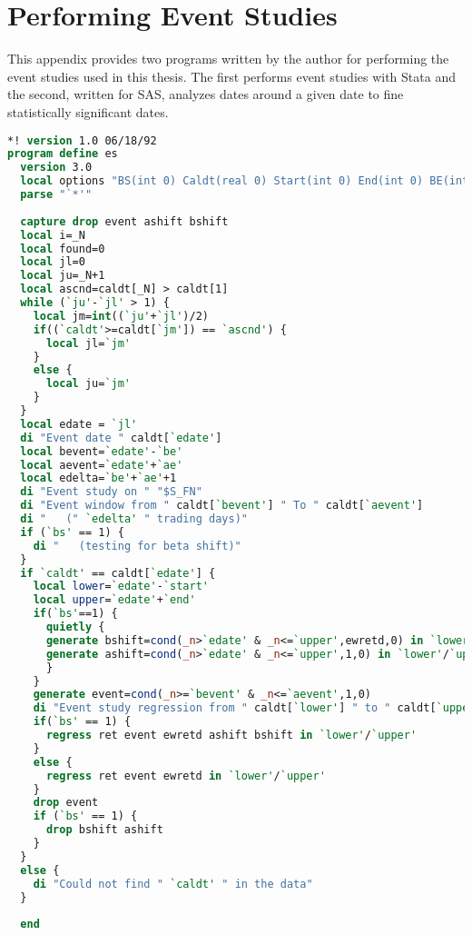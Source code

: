 
\appendix
\chapter{Performing Event Studies}

This appendix provides two programs written by the author for performing the event studies used in this thesis.  The first performs event studies with Stata and the second, written for SAS, analyzes dates around a given date to fine statistically significant dates.

\begin{singlespace}
\begin{lstlisting}[language=stata,caption=Event studies with Stata]
*! version 1.0 06/18/92
program define es
  version 3.0
  local options "BS(int 0) Caldt(real 0) Start(int 0) End(int 0) BE(int 0) AE(int 0)"
  parse "`*'"
  
  capture drop event ashift bshift
  local i=_N
  local found=0
  local jl=0
  local ju=_N+1
  local ascnd=caldt[_N] > caldt[1]
  while (`ju'-`jl' > 1) {
    local jm=int((`ju'+`jl')/2)
    if((`caldt'>=caldt[`jm']) == `ascnd') {
      local jl=`jm'
    }
    else {
      local ju=`jm'
    }
  }
  local edate = `jl'
  di "Event date " caldt[`edate']
  local bevent=`edate'-`be'
  local aevent=`edate'+`ae'
  local edelta=`be'+`ae'+1
  di "Event study on " "$S_FN"
  di "Event window from " caldt[`bevent'] " To " caldt[`aevent']
  di "   (" `edelta' " trading days)"
  if (`bs' == 1) {
    di "   (testing for beta shift)"
  }
  if `caldt' == caldt[`edate'] {
    local lower=`edate'-`start'
    local upper=`edate'+`end'
    if(`bs'==1) {
      quietly {
      generate bshift=cond(_n>`edate' & _n<=`upper',ewretd,0) in `lower'/`upper'
      generate ashift=cond(_n>`edate' & _n<=`upper',1,0) in `lower'/`upper'
      }
    }
    generate event=cond(_n>=`bevent' & _n<=`aevent',1,0)
    di "Event study regression from " caldt[`lower'] " to " caldt[`upper']
    if(`bs' == 1) {
      regress ret event ewretd ashift bshift in `lower'/`upper'
    }
    else {
      regress ret event ewretd in `lower'/`upper'
    }
    drop event
    if (`bs' == 1) {
      drop bshift ashift
    }
  }
  else {
    di "Could not find " `caldt' " in the data"
  }
     
  end
\end{lstlisting}
\end{singlespace}

